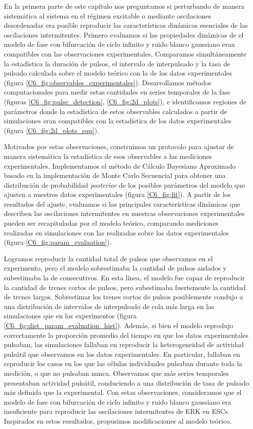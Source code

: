 \documentclass[./main.tex]{subfiles}
\begin{document}
En la primera parte de este capítulo nos preguntamos si perturbando de manera sistemática al sistema en el régimen excitable o mediante oscilaciones desordenadas era posible reproducir las características dinámicas esenciales de las oscilaciones intermitentes. Primero evaluamos si las propiedades dinámicas de el modelo de fase con bifurcación de ciclo infinito y ruido blanco gaussiano eran compatibles con las observaciones experimentales. Comparamos simultáneamente la estadística la duración de pulsos, el intervalo de interpulsado y la tasa de pulsado calculada sobre el modelo teórico con la de los datos experimentales (figura \ref{C6_fig:observables_experimentales}). Desarrollamos métodos computacionales para medir estas cantidades en series temporales de la fase (figuras \ref{C6_fig:pulse_detection}, \ref{C6_fig:2d_plots}), e identificamos regiones de parámetros donde la estadística de estos observables calculados a partir de simulaciones eran compatibles con la estadística de los datos experimentales (figura \ref{C6_fig:2d_plots_sup}). 


Motivados por estas observaciones, construimos un protocolo para ajustar de manera sistemática la estadística de esos observables a las mediciones experimentales. Implementamos el método de Cálculo Bayesiano Aproximado basado en la implementación de Monte Carlo Secuencial para obtener una distribución de probabilidad \textit{posterior} de los posibles parámetros del modelo que ajusten a nuestros datos experimentales (figura \ref{C6_fig:fit}). A partir de los resultados del ajuste, evaluamos si las principales características dinámicas que describen las oscilaciones intermitentes en nuestras observaciones experimentales pueden ser recapituladas por el modelo teórico, comparando mediciones realizadas en simulaciones con las realizadas sobre los datos experimentales (figura \ref{C6_fig:param_evaluation}). 

Logramos reproducir la cantidad total de pulsos que observamos en el experimento, pero el modelo sobrestimaba la cantidad de pulsos aislados y subestimaba la de consecutivos. En esta línea, el modelo fue capaz de reproducir la cantidad de trenes cortos de pulsos, pero subestimaba fuertemente la cantidad de trenes largos. Sobrestimar los trenes cortos de pulsos posiblemente condujo a una distribución de intervalos de interpulsado de cola más larga en las simulaciones que en los experimentos (figura \ref{C6_fig:dist_param_evaluation_hist}). Además, si bien el modelo reprodujo correctamente la proporción promedio del tiempo en que los datos experimentales pulsaban, las simulaciones fallaban en reproducir la heterogeneidad de actividad pulsátil que observamos en los datos experimentales. En particular, fallaban en reproducir los casos en los que las células individuales pulsaban durante toda la medición, o que no pulsaban nunca. Observamos que más series temporales presentaban actividad pulsátil, conduciendo a una distribución de tasa de pulsado más definida que la experimental. Con estas observaciones, consideramos que el modelo de fase con bifurcación de ciclo infinito y ruido blanco gaussiano era insuficiente para reproducir las oscilaciones intermitentes de ERK en ESCs. Inspirados en estos resultados, propusimos modificaciones al modelo teórico.
\end{document}
